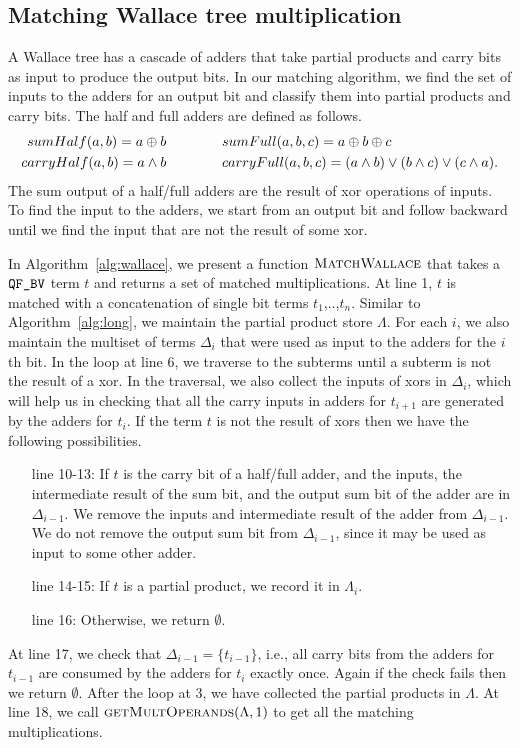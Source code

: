 \subsection{Matching Wallace tree multiplication}


A Wallace tree has a cascade of adders that take partial products 
and carry bits as input to produce the output bits.
%
In our matching algorithm, we find the set of inputs
to the adders for an output bit and classify them into
partial products and carry bits.
%
The half and full adders are defined as follows.
\begin{align*}
sumHalf(a,b) = a \oplus b  \qquad& \qquad sumFull(a,b,c) = a \oplus b \oplus c\\
carryHalf(a,b) = a \land b \qquad&\qquad
carryFull(a,b,c) = (a \land b) \lor (b \land c) \lor (c \land a).
\end{align*}
%
The sum output of a half/full adders are the result of 
xor operations of inputs.
%
To find the input to the adders, we start from an
output bit and follow backward until we find the input that
are not the result of some xor.

In Algorithm~\ref{alg:wallace}, we present a function
$\textsc{MatchWallace}$ that takes a $\texttt{QF\_BV}$ term $t$ and returns a
set of matched multiplications.
%
At line 1, $t$ is matched with a concatenation of single bit terms $t_1$,..,$t_n$.
%
Similar to Algorithm~\ref{alg:long},
we maintain the partial product store $\Lambda$.
%
For each $i$,
we also maintain the multiset of terms $\Delta_i$ that were used as 
input to the adders for the $i$th bit.
%
In the loop at line 6, we traverse to the subterms until
a subterm is not the result of a xor.
%
In the traversal, we also collect the inputs of xors in $\Delta_i$, which
will help us in checking that all the carry inputs in adders for $t_{i+1}$
are generated by the adders for $t_i$.
%
If the term $t$ is not the result of xors then
we have the following possibilities.
%
\begin{itemize}
\item[line 10-13:]
  If $t$ is the carry bit of a half/full adder, and the inputs, the intermediate
  result of the sum bit, and the output sum bit
  of the adder are in $\Delta_{i-1}$. We remove the inputs and intermediate result
  of the adder from $\Delta_{i-1}$.
  We do not remove the output sum bit from $\Delta_{i-1}$, since it may be
  used as input to some other adder.
\item[line 14-15:] If $t$ is a partial product, we record it in $\Lambda_i$.
\item[line 16:] Otherwise, we return $\emptyset$.
\end{itemize}
At line 17, we check that $\Delta_{i-1} = \{t_{i-1}\}$, i.e., all carry bits from
the adders for $t_{i-1}$ are consumed by the adders for $t_i$ exactly once.
%
Again if the check fails then we return $\emptyset$.
%
After the loop at 3, we have collected the partial products in $\Lambda$.
%
At line 18, we call $\textsc{getMultOperands}(\Lambda,1)$ to get all
the matching multiplications.

